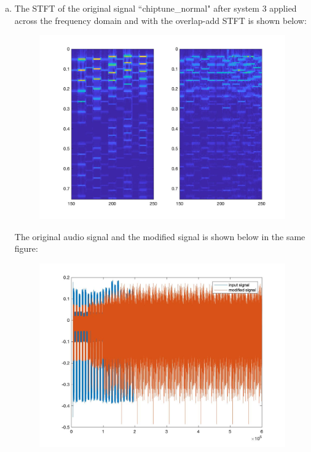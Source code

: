 \documentclass[a4paper]{article}
\begin{document}
\begin{spacing}{2.0}
\begin{enumerate}[(a)]
\item The STFT of the original signal ``chiptune\_normal" after system 3 applied across the frequency domain and with the overlap-add STFT is shown below:
\begin{figure}[H]
\centering
\includegraphics[width=5in]{4c.jpg}
\label{fig:graph}
\end{figure}
The original audio signal and the modified signal is shown below in the same figure:
\begin{figure}[H]
\centering
\includegraphics[width=5in]{4c_audio.jpg}
\label{fig:graph}
\end{figure}
\end{enumerate}



\end{spacing}
\end{document}
